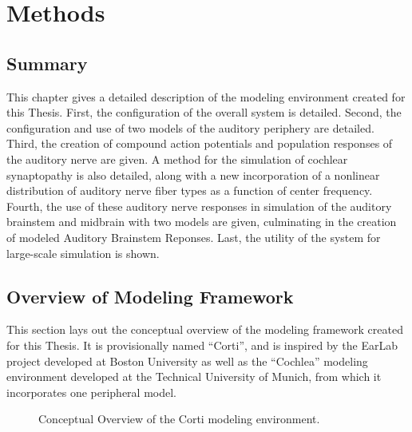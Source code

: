 \chapter{Methods}
\label{chapter:Methods}
\thispagestyle{myheadings}

\graphicspath{{4_Methods/Figures/}}

\section{Summary} %
\label{sec:summary}
This chapter gives a detailed description of the modeling environment created for this Thesis.  First, the configuration of the overall system is detailed.  Second, the configuration and use of two models of the auditory periphery are detailed.  Third, the creation of compound action potentials and population responses of the auditory nerve are given.  A method for the simulation of cochlear synaptopathy is also detailed, along with a new incorporation of a nonlinear distribution of auditory nerve fiber types as a function of center frequency.  Fourth, the use of these auditory nerve responses in simulation of the auditory brainstem and midbrain with two models are given, culminating in the creation of modeled Auditory Brainstem Reponses.  Last, the utility of the system for large-scale simulation is shown. 

\section{Overview of Modeling Framework} %
\label{sec:overview_of_modeling_framework}
This section lays out the conceptual overview of the modeling framework created for this Thesis.  It is provisionally named ``Corti''\cite{Voysey2016Corti}, and is inspired by the EarLab project developed at Boston University as well as the ``Cochlea''\cite{Rudnicki2014Cochlea} modeling environment developed at the Technical University of Munich, from which it incorporates one peripheral model. 

\begin{figure}[htbp]
	\centering
	\caption{Conceptual Overview of the Corti modeling environment.}
	\label{fig:corti-overview}
\end{figure}

